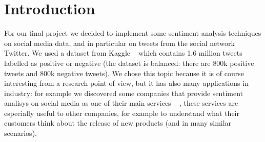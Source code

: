 \section*{Introduction}
For our final project we decided to implement some sentiment analysis techniques on social media data, and in particular on tweets from the social network Twitter. We used a dataset from Kaggle ~\cite{data:sentiment140} which contains 1.6 million tweets labelled as positive or negative (the dataset is balanced: there are 800k positive tweets and 800k negative tweets). We chose this topic because it is of course interesting from a research point of view, but it has also many applications in industry: for example we discovered some companies that provide sentiment analisys on social media as one of their main services ~\cite{startups:spiketrap} , these services are especially useful to other companies, for example to understand what their customers think about the release of new products (and in many similar scenarios). 